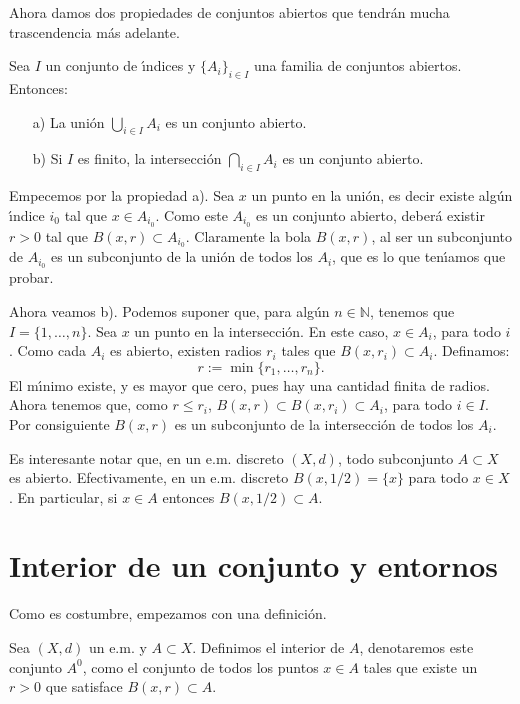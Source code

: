 Ahora damos dos propiedades de conjuntos abiertos que tendr\'an
mucha trascendencia m\'as adelante.
\begin{teorema}\label{teo,uniointerabiertos} Sea $I$ un conjunto de \'{\i}ndices y
$\{A_i\}_{i\in I}$ una familia de conjuntos abiertos. Entonces:
\begin{itemize}
\item[a)] La uni\'on $\bigcup_{i\in I}A_i$ es un conjunto abierto.
\item[b)] Si $I$ es finito, la intersecci\'on $\bigcap_{i\in
I}A_i$ es un conjunto abierto.
\end{itemize}
\end{teorema}
\begin{demo} Empecemos por la propiedad a). Sea $x$ un punto en la
uni\'on, es decir existe alg\'un \'{\i}ndice $i_0$ tal que $x\in
A_{i_0}$. Como este $A_{i_0}$ es un conjunto abierto, deber\'a
existir $r>0$ tal que $B(x,r)\subset A_{i_0}$. Claramente la bola
$B(x,r)$, al ser un subconjunto de $A_{i_0}$ es un subconjunto de
la uni\'on de todos los $A_i$, que es lo que ten\'{\i}amos que
probar.

Ahora veamos b). Podemos suponer que, para alg\'un $n\in
\mathbb{N}$, tenemos que $I=\{1,\dots,n\}$. Sea $x$ un punto en la
intersecci\'on. En este caso, $x\in A_i$, para todo $i$. Como cada
$A_i$ es abierto, existen radios $r_i$ tales que $B(x,r_i)\subset
A_i$. Definamos:
\[
	r:=\min\{r_1,\dots,r_n\}.
\]
El m\'{\i}nimo existe, y es mayor que cero, pues hay una cantidad
finita de radios. Ahora tenemos que, como $r\leq r_i$,
$B(x,r)\subset B(x,r_i)\subset A_i$, para todo $i\in I$. Por
consiguiente $B(x,r)$ es un subconjunto de la intersecci\'on de
todos los $A_i$.
\end{demo}

Es interesante notar que, en un e.m. discreto $(X,d)$, todo
subconjunto $A\subset X$ es abierto. Efectivamente, en un e.m.
discreto $B(x,1/2)=\{x\}$ para todo $x\in X$. En particular, si
$x\in A$ entonces $B(x,1/2)\subset A$.

\section{Interior de un conjunto y entornos} Como es costumbre,
empezamos con una definici\'on.
\begin{definicion} Sea $(X,d)$ un e.m. y $A\subset X$. Definimos
el interior de $A$, denotaremos este conjunto $A^0$, como el
conjunto de todos los puntos $x\in A$ tales que existe un $r>0$
que satisface $B(x,r)\subset A$.
\end{definicion}

